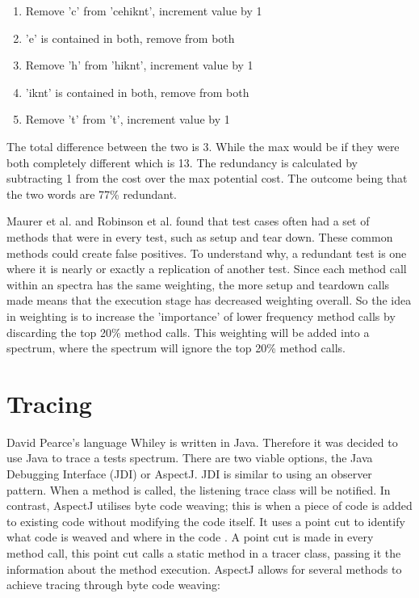 \begin{enumerate}
\item Remove 'c' from 'cehiknt', increment value by 1
\item 'e' is contained in both, remove from both
\item Remove 'h' from 'hiknt', increment value by 1
\item 'iknt' is contained in both, remove from both
\item Remove 't' from 't', increment value by 1
\end{enumerate}

The total difference between the two is 3. While the max would be if they were both completely different which is 13. The redundancy is calculated by subtracting 1 from the cost over the max potential cost. The outcome being that the two words are 77\% redundant.

Maurer et al. \cite{koochakzadeh2009test} and Robinson et al. \cite{li2008static} found that test cases often had a set of methods that were in every test, such as setup and tear down. These common methods could create false positives. To understand why, a redundant test is one where it is nearly or exactly a replication of another test. Since each method call within an spectra has the same weighting, the more setup and teardown calls made means that the execution stage has decreased weighting overall. So the idea in weighting is to increase the 'importance' of lower frequency method calls by discarding the top 20\% method calls. This weighting will be added into a spectrum, where the spectrum will ignore the top 20\% method calls.

\section{Tracing}
\label{S:trace}

David Pearce's language Whiley is written in Java. Therefore it was decided to use Java to trace a tests spectrum. There are two viable options, the Java Debugging Interface (JDI) or AspectJ. JDI is similar to using an observer pattern. When a method is called, the listening trace class will be notified. In contrast, AspectJ utilises byte code weaving; this is when a piece of code is added to existing code without modifying the code itself. It uses a point cut to identify what code is weaved and where in the code \cite{aspectwiki}. A point cut is made in every method call, this point cut calls a static method in a tracer class, passing it the information about the method execution. AspectJ allows for several methods to achieve tracing through byte code weaving:

